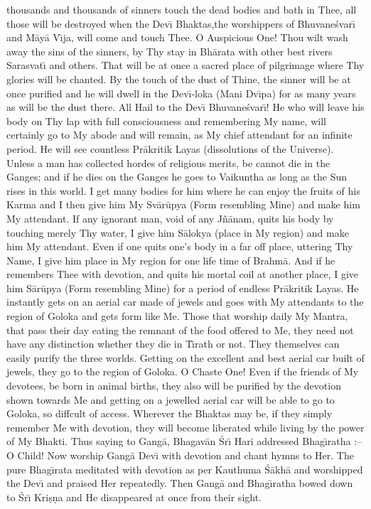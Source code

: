 thousands and thousands of sinners touch the dead bodies and bath in Thee, all those will be destroyed when the Dev\={\i} Bhaktas,the worshippers of Bhuvane\'svar\={\i} and M\=ay\=a V\={\i}ja, will come and touch Thee. O Auspicious One! Thou wilt wash away the sins of the sinners, by Thy stay in Bh\=arata with other best rivers Sarasvat\={\i} and others. That will be at once a sacred place of pilgrimage where Thy glories will be chanted. By the touch of the dust of Thine, the sinner will be at once purified and he will dwell in the Dev\={\i}-loka (Mani Dv\={\i}pa) for as many years as will be the dust there. All Hail to the Dev\={\i} Bhuvane\'svar\={\i}! He who will leave his body on Thy lap with full consciousness and remembering My name, will certainly go to My abode and will remain, as My chief attendant for an infinite period. He will see countless Pr\=akritik Layas (dissolutions of the Universe). Unless a man has collected hordes of religious merits, be cannot die in the Ganges; and if he dies on the Ganges he goes to Vaikuntha as long as the Sun rises in this world. I get many bodies for him where he can enjoy the fruits of his Karma and I then give him My Sv\=ar\=upya (Form resembling Mine) and make him My attendant. If any ignorant man, void of any J\~n\=anam, quits his body by touching merely Thy water, I give him S\=alokya (place in My region) and make him My attendant. Even if one quits one's body in a far off place, uttering Thy Name, I give him place in My region for one life time of Brahm\=a. And if he remembers Thee with devotion, and quits his mortal coil at another place, I give him S\=ar\=upya (Form resembling Mine) for a period of endless Pr\=akritik Layas. He instantly gets on an aerial car made of jewels and goes with My attendants to the region of Goloka and gets form like Me. Those that worship daily My Mantra, that pass their day eating the remnant of the food offered to Me, they need not have any distinction whether they die in T\={\i}rath or not. They themselves can easily purify the three worlds. Getting on the excellent and best aerial car built of jewels, they go to the region of Goloka. O Chaste One! Even if the friends of My devotees, be born in animal births, they also will be purified by the devotion shown towards Me and getting on a jewelled aerial car will be able to go to Goloka, so diffcult of access. Wherever the Bhaktas may be, if they simply remember Me with devotion, they will become liberated while living by the power of My Bhakti. Thus saying to Gang\=a, Bhagav\=an \'Sr\={\i} Hari addressed Bhag\={\i}ratha :-- O Child! Now worship Gang\=a Dev\={\i} with devotion and chant hymns to Her. The pure Bhag\={\i}rata meditated with devotion as per Kauthuma \'S\=akh\=a and worshipped the Dev\={\i} and praised Her repeatedly. Then Gang\=a and Bhag\={\i}ratha bowed down to \'Sr\={\i} Kri\d{s}\d{n}a and He disappeared at once from their sight.

